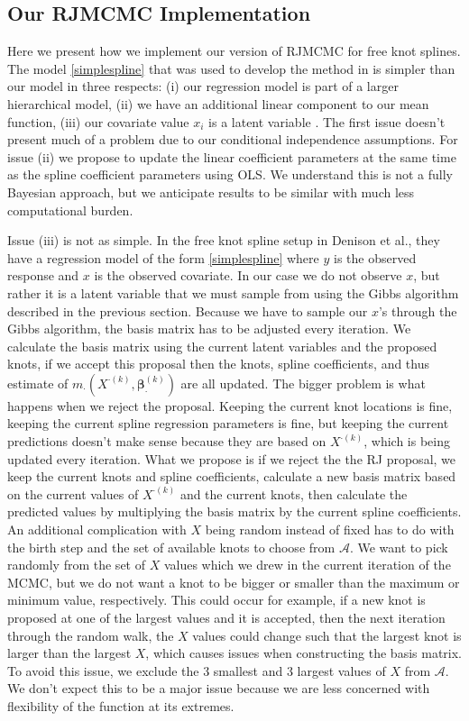 \documentclass[11pt]{article}\usepackage[]{graphicx}\usepackage[]{color}
\begin{document}
\subsection{Our RJMCMC Implementation}

Here we present how we implement our version of RJMCMC for free knot splines. The model \eqref{simplespline} that was used to develop the method in \cite{denison} is simpler than our model in three respects: (i) our regression model is part of a larger hierarchical model, (ii) we have an additional linear component to our mean function, (iii) our covariate value $x_i$ is a latent variable . The first issue doesn't present much of a problem due to our conditional independence assumptions. For issue (ii) we propose to update the linear coefficient parameters at the same time as the spline coefficient parameters using OLS. We understand this is not a fully Bayesian approach, but we anticipate results to be similar with much less computational burden.

Issue (iii) is not as simple. In the free knot spline setup in Denison et al., they have a regression model of the form \eqref{simplespline} where $y$ is the observed response and $x$ is the observed covariate. In our case we do not observe $x$, but rather it is a latent variable that we must sample from using the Gibbs algorithm described in the previous section. Because we have to sample our $x$'s through the Gibbs algorithm, the basis matrix has to be adjusted every iteration. We calculate the basis matrix using the current latent variables and  the proposed knots, if we accept this proposal then the knots, spline coefficients, and thus estimate of $m_{\cdot}(X^{\cdot (k)},\boldsymbol{\beta}_{\cdot}^{(k)})$ are all updated. The bigger problem is what happens when we reject the proposal. Keeping the current knot locations is fine, keeping the current spline regression parameters is fine, but keeping the current predictions doesn't make sense because they are based on $X^{\cdot (k)}$, which is being updated every iteration. What we propose is if we reject the the RJ proposal, we keep the current knots and spline coefficients, calculate a new basis matrix based on the current values of $X^{\cdot (k)}$ and the current knots, then calculate the predicted values by multiplying the basis matrix by the current spline coefficients. An additional complication with $X$ being random instead of fixed has to do with the birth step and the set of available knots to choose from $\mathcal{A}$. We want to pick randomly from the set of $X$ values which we drew in the current iteration of the MCMC, but we do not want a knot to be bigger or smaller than the maximum or minimum value, respectively. This could occur for example, if a new knot is proposed at one of the largest values and it is accepted, then the next iteration through the random walk, the $X$ values could change such that the largest knot is larger than the largest $X$, which causes issues when constructing the basis matrix. To avoid this issue, we exclude the 3 smallest and 3 largest values of $X$ from $\mathcal{A}$. We don't expect this to be a major issue because we are less concerned with flexibility of the function at its extremes.
\end{document}
